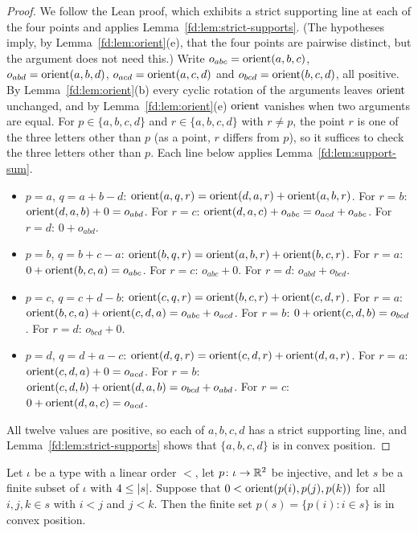 \begin{proof}
We follow the Lean proof, which exhibits a strict supporting line at each of the four points and applies
Lemma~\ref{fd:lem:strict-supports}. (The hypotheses imply, by Lemma~\ref{fd:lem:orient}(e), that the four
points are pairwise distinct, but the argument does not need this.) Write $o_{abc}=\operatorname{orient}(a,b,c)$,
$o_{abd}=\operatorname{orient}(a,b,d)$, $o_{acd}=\operatorname{orient}(a,c,d)$ and $o_{bcd}=\operatorname{orient}(b,c,d)$, all positive. By
Lemma~\ref{fd:lem:orient}(b) every cyclic rotation of the arguments leaves $\operatorname{orient}$ unchanged, and by
Lemma~\ref{fd:lem:orient}(e) $\operatorname{orient}$ vanishes when two arguments are equal. For $p\in\{a,b,c,d\}$ and
$r\in\{a,b,c,d\}$ with $r\ne p$, the point $r$ is one of the three letters other than $p$ (as a point, $r$
differs from $p$), so it suffices to check the three letters other than $p$. Each line below applies
Lemma~\ref{fd:lem:support-sum}.
\begin{itemize}
\item $p=a$, $q=a+b-d$: $\operatorname{orient}(a,q,r)=\operatorname{orient}(d,a,r)+\operatorname{orient}(a,b,r)$. For $r=b$:
  $\operatorname{orient}(d,a,b)+0=o_{abd}$. For $r=c$: $\operatorname{orient}(d,a,c)+o_{abc}=o_{acd}+o_{abc}$. For $r=d$:
  $0+o_{abd}$.
\item $p=b$, $q=b+c-a$: $\operatorname{orient}(b,q,r)=\operatorname{orient}(a,b,r)+\operatorname{orient}(b,c,r)$. For $r=a$:
  $0+\operatorname{orient}(b,c,a)=o_{abc}$. For $r=c$: $o_{abc}+0$. For $r=d$: $o_{abd}+o_{bcd}$.
\item $p=c$, $q=c+d-b$: $\operatorname{orient}(c,q,r)=\operatorname{orient}(b,c,r)+\operatorname{orient}(c,d,r)$. For $r=a$:
  $\operatorname{orient}(b,c,a)+\operatorname{orient}(c,d,a)=o_{abc}+o_{acd}$. For $r=b$: $0+\operatorname{orient}(c,d,b)=o_{bcd}$. For $r=d$:
  $o_{bcd}+0$.
\item $p=d$, $q=d+a-c$: $\operatorname{orient}(d,q,r)=\operatorname{orient}(c,d,r)+\operatorname{orient}(d,a,r)$. For $r=a$:
  $\operatorname{orient}(c,d,a)+0=o_{acd}$. For $r=b$: $\operatorname{orient}(c,d,b)+\operatorname{orient}(d,a,b)=o_{bcd}+o_{abd}$. For $r=c$:
  $0+\operatorname{orient}(d,a,c)=o_{acd}$.
\end{itemize}
All twelve values are positive, so each of $a,b,c,d$ has a strict supporting line, and
Lemma~\ref{fd:lem:strict-supports} shows that $\{a,b,c,d\}$ is in convex position.
\end{proof}

\begin{lemma}\label{fd:lem:pos-triples}\sloppy
Let $\iota$ be a type with a linear order $<$, let $p\colon\iota\to\mathbb R^2$ be injective, and let $s$ be a
finite subset of $\iota$ with $4\le\lvert s\rvert$. Suppose that $0<\operatorname{orient}(p(i),p(j),p(k))$ for all
$i,j,k\in s$ with $i<j$ and $j<k$. Then the finite set $p(s)=\{p(i):i\in s\}$ is in convex position.
\end{lemma}

